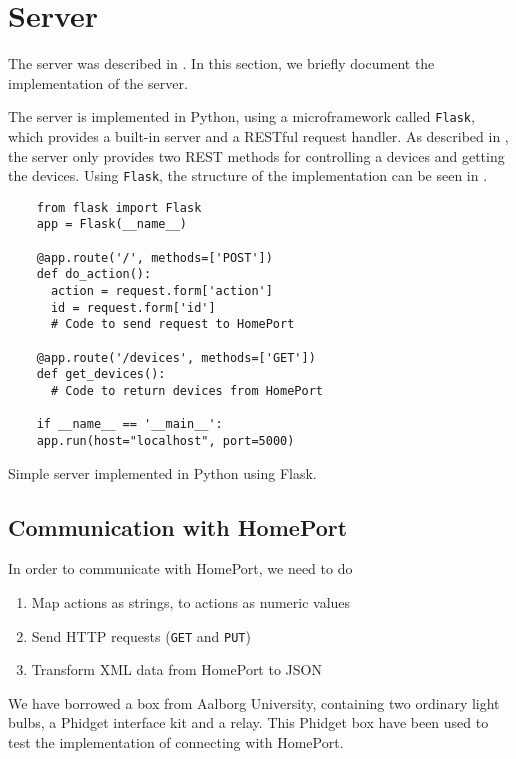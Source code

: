 \section{Server}\label{sec:serverimplementation}
The server was described in . 
In this section, we briefly document the implementation of the server.

The server is implemented in Python,
using a microframework called \texttt{Flask},
which provides a built-in server and a RESTful request handler. 
As described in , 
the server only provides two REST methods for controlling a devices and getting the devices. 
Using \texttt{Flask}, the structure of the implementation can be seen in .

\begin{listing}
  \begin{verbatim}
    from flask import Flask
    app = Flask(__name__)
    
    @app.route('/', methods=['POST'])
    def do_action():
      action = request.form['action']
      id = request.form['id']
      # Code to send request to HomePort
      
    @app.route('/devices', methods=['GET'])
    def get_devices():
      # Code to return devices from HomePort
    
    if __name__ == '__main__':
    app.run(host="localhost", port=5000)
  \end{verbatim}
  \caption{Simple server implemented in Python using Flask.}
  \label{lst:server}
\end{listing}

\subsection{Communication with HomePort}
In order to communicate with HomePort, 
we need to do
\begin{enumerate}
  \item Map actions as strings, to actions as numeric values
  \item Send HTTP requests (\texttt{GET} and \texttt{PUT})
  \item Transform XML data from HomePort to JSON
\end{enumerate}

We have borrowed a box from Aalborg University,
containing two ordinary light bulbs, 
a Phidget interface kit and a relay.
This Phidget box have been used to test the implementation of connecting with HomePort. 

